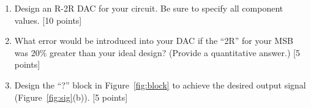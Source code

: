 \begin{enumerate}
\item Design an R-2R DAC for your circuit. Be sure to specify all component values.  [10 points]

\item What error would be introduced into your DAC if the ``2R'' for your MSB
was 20\% greater than your ideal design?  (Provide a quantitative answer.) [5
points]

\item Design the ``?'' block in Figure~\ref{fig:block} to achieve the desired
output signal (Figure~\ref{fig:sig}(b)).  [5 points]

\end{enumerate}

\clearpage



\clearpage



\clearpage



\clearpage
